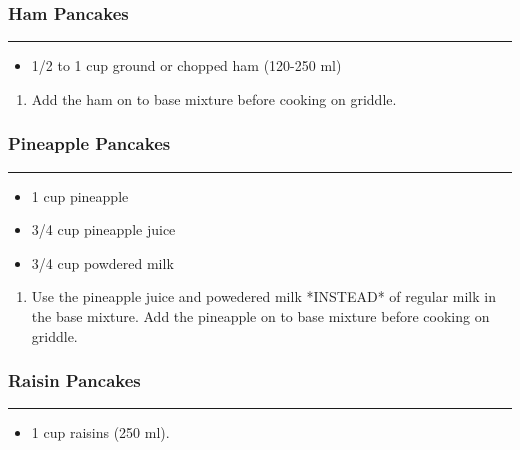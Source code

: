 \documentclass{article}
\begin{document}
\subsubsection{Ham Pancakes} 
\noindent\rule[0.5ex]{\linewidth}{0.5pt}

\begin{framed}
\begin{itemize}
    \item 1/2 to 1 cup ground or chopped ham (120-250 ml)
\end{itemize}
\end{framed}

\begin{enumerate}
    \item 
        Add the ham on to base mixture before cooking on griddle.
\end{enumerate}

\subsubsection{Pineapple Pancakes} 
\noindent\rule[0.5ex]{\linewidth}{0.5pt}

\begin{framed}
\begin{itemize}
    \item 1 cup pineapple
    \item 3/4 cup pineapple juice
    \item 3/4 cup powdered milk
\end{itemize}
\end{framed}

\begin{enumerate}
    \item 
        Use the pineapple juice and powedered milk *INSTEAD* of regular milk in the base mixture. Add the pineapple on to base mixture before cooking on griddle.
\end{enumerate}

\subsubsection{Raisin Pancakes} 
\noindent\rule[0.5ex]{\linewidth}{0.5pt}

\begin{framed}
\begin{itemize}
    \item 1 cup raisins (250 ml). 
\end{itemize}
\end{framed}
\end{document}
